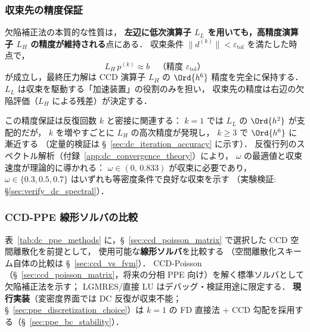 \subsubsection{収束先の精度保証}
\label{sec:dc_accuracy}

欠陥補正法の本質的な性質は，
\textbf{左辺に低次演算子 $L_L$ を用いても，高精度演算子 $L_H$ の精度が維持される}点にある．
収束条件 $\|d^{(k)}\| < \varepsilon_\mathrm{tol}$ を満たした時点で，
\begin{equation}
  L_H\,p^{(k)} \approx b
  \quad\text{（精度 $\varepsilon_\mathrm{tol}$）}
\end{equation}
が成立し，最終圧力解は CCD 演算子 $L_H$ の $\Ord{h^6}$ 精度を完全に保持する．
$L_L$ は収束を駆動する「加速装置」の役割のみを担い，
収束先の精度は右辺の欠陥評価（$L_H$ による残差）が決定する．

この精度保証は反復回数 $k$ と密接に関連する：
$k=1$ では $L_L$ の $\Ord{h^2}$ が支配的だが，
$k$ を増やすごとに $L_H$ の高次精度が発現し，
$k \geq 3$ で $\Ord{h^6}$ に漸近する
（定量的検証は §~\ref{sec:dc_iteration_accuracy} に示す）．
反復行列のスペクトル解析（付録~\ref{app:dc_convergence_theory}）により，
$\omega$ の最適値と収束速度が理論的に導かれる：
$\omega \in (0,\, 0.833)$ が収束に必要であり，
$\omega \in \{0.3, 0.5, 0.7\}$ はいずれも等密度条件で良好な収束を示す
（実験検証: §\ref{sec:verify_dc_spectral}）．

\subsubsection{CCD-PPE 線形ソルバの比較}
\label{sec:dc_comparison}

表~\ref{tab:dc_ppe_methods} に，§~\ref{sec:ccd_poisson_matrix} で選択した CCD 空間離散化を前提として，
使用可能な\textbf{線形ソルバ}を比較する
（空間離散化スキーム自体の比較は §~\ref{sec:ccd_vs_fvm}）．
CCD-Poisson（§~\ref{sec:ccd_poisson_matrix}，将来の分相 PPE 向け）を解く標準ソルバとして欠陥補正法を示す；
LGMRES/直接 LU はデバッグ・検証用途に限定する．
\textbf{現行実装}（変密度界面では DC 反復が収束不能；§~\ref{sec:ppe_discretization_choice}）は $k=1$ の FD 直接法 + CCD 勾配を採用する（§~\ref{sec:ppe_bc_stability}）．

